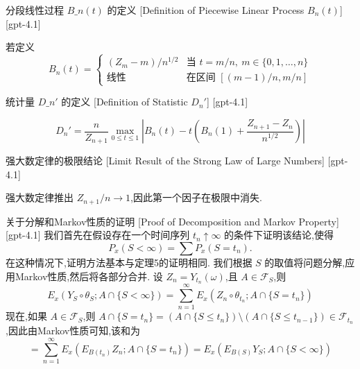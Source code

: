\documentclass[UTF8]{ctexart}
\begin{document}
    
    
    \begin{dfn}
        {分段线性过程 $B\_n(t)$ 的定义}
        [Definition of Piecewise Linear Process $B_n(t)$]
        [gpt-4.1]
        
若定义
\[
B_{n}(t) = 
\begin{cases}
(Z_{m} - m) / n^{1/2} & \text{当 } t = m/n, \ m \in \{ 0, 1, \ldots, n \} \\
\text{线性} & \text{在区间 } [(m-1)/n, m/n]
\end{cases}
\]

    \end{dfn}
    
    
    
    \begin{dfn}
        {统计量 $D\_n'$ 的定义}
        [Definition of Statistic $D_n'$]
        [gpt-4.1]
        
\[
D_{n}' = \frac{n}{Z_{n+1}} \max_{0 \leq t \leq 1} \left| B_{n}(t) - t \left( B_{n}(1) + \frac{Z_{n+1} - Z_{n}}{n^{1/2}} \right) \right|
\]

    \end{dfn}
    
    
    
    \begin{thm}
        {强大数定律的极限结论}
        [Limit Result of the Strong Law of Large Numbers]
        [gpt-4.1]
        
强大数定律推出 $Z_{n+1} / n \to 1$,因此第一个因子在极限中消失.

    \end{thm}
    
    
    
    \begin{prf}
        {关于分解和Markov性质的证明}
        [Proof of Decomposition and Markov Property]
        [gpt-4.1]
        我们首先在假设存在一个时间序列 $t_n \uparrow \infty$ 的条件下证明该结论,使得
\[
P_x (S < \infty) = \sum P_x (S = t_n).
\]
在这种情况下,证明方法基本与定理5的证明相同.
我们根据 $S$ 的取值将问题分解,应用Markov性质,然后将各部分合并.
设 $Z_n = Y_{t_n}(\omega)$,且 $A \in \mathcal{F}_S$,则
\[
E_x (Y_S \circ \theta_S ; A \cap \{ S < \infty \}) = \sum_{n=1}^{\infty} E_x (Z_n \circ \theta_{t_n} ; A \cap \{ S = t_n \})
\]
现在,如果 $A \in \mathcal{F}_S$,则 $A \cap \{ S = t_n \} = (A \cap \{ S \leq t_n \}) \setminus (A \cap \{ S \leq t_{n-1} \}) \in \mathcal{F}_{t_n}$,因此由Markov性质可知,该和为
\[
= \sum_{n=1}^{\infty} E_x (E_{B(t_n)} Z_n ; A \cap \{ S = t_n \}) = E_x (E_{B(S)} Y_S ; A \cap \{ S < \infty \})
\]

    \end{prf}
    
\end{document}
